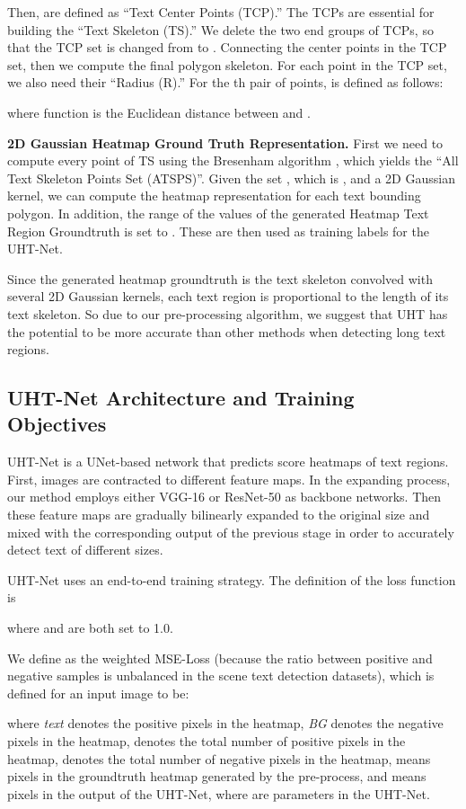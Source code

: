 \documentclass[10pt,twocolumn,letterpaper]{article}
\begin{document}
Then,  are defined as ``Text Center Points (TCP).'' The TCPs are essential for building the ``Text Skeleton (TS).'' We delete the two end groups of TCPs, so that the TCP set is changed from  to . Connecting the center points in the TCP set, then we compute the final polygon skeleton. For each point in the TCP set, we also need their ``Radius (R).'' For the th pair of points,  is defined as follows:

where function  is the Euclidean distance between  and . 

\textbf{2D Gaussian Heatmap Ground Truth Representation.} First we need to compute every point of TS using the Bresenham algorithm \cite{bresenham}, which yields the ``All Text Skeleton Points Set (ATSPS)''. Given the set , which is , and a 2D Gaussian kernel, we can compute the heatmap representation for each text bounding polygon. In addition, the range of the values of the generated Heatmap Text Region Groundtruth is set to . These are then used as training labels for the UHT-Net.

Since  the generated heatmap groundtruth is the text skeleton convolved with several 2D Gaussian kernels, each text region is proportional to the length of its text skeleton. So due to our pre-processing algorithm, we suggest that UHT has the potential to be more accurate than other methods when detecting long text regions. 

\subsection{UHT-Net Architecture and Training Objectives}

UHT-Net is a UNet-based \cite{unet} network that predicts score heatmaps of text regions. First, images are contracted to different feature maps. In the expanding process, our method employs either VGG-16 \cite{vgg} or ResNet-50 \cite{resnet} as backbone networks. Then these feature maps are gradually bilinearly expanded to the original size and mixed with the corresponding output of the previous stage in order to accurately detect text of different sizes.

UHT-Net uses an end-to-end training strategy. The definition of the loss function is

where  and  are both set to 1.0. 

We define  as the weighted MSE-Loss (because the ratio between positive and negative samples is unbalanced in the scene text detection datasets), which is defined for an input image  to be:
\begin{small}

\end{small}
\noindent
where {\em text} denotes the positive pixels in the heatmap, {\em BG} denotes the negative pixels in the heatmap,  denotes the total number of positive pixels in the heatmap,  denotes the total number of negative pixels in the heatmap,  means pixels in the groundtruth heatmap generated by the pre-process, and  means pixels in the output of the UHT-Net, where  are parameters in the UHT-Net. 
\end{document}
